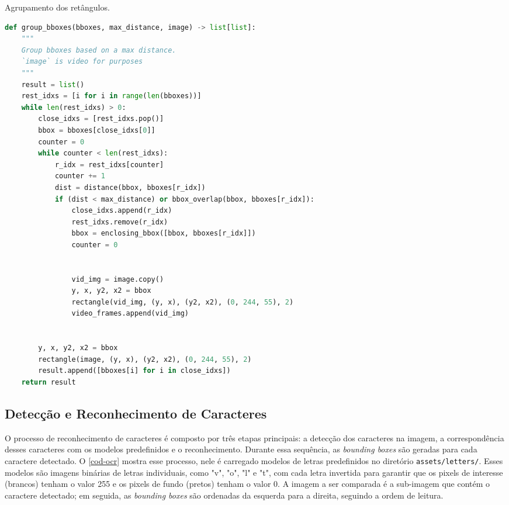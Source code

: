 \documentclass[english, 
               brazil, 
               bsc] %
               {dcomp-abntex2}
\begin{document}
\begin{codigo}[h]
  \caption{\small Agrupamento dos retângulos.}
 \label{cod-group_bboxes}
\begin{lstlisting}[language=python]
def group_bboxes(bboxes, max_distance, image) -> list[list]:
    """
    Group bboxes based on a max distance.
    `image` is video for purposes
    """
    result = list()
    rest_idxs = [i for i in range(len(bboxes))]
    while len(rest_idxs) > 0:
        close_idxs = [rest_idxs.pop()]
        bbox = bboxes[close_idxs[0]]
        counter = 0
        while counter < len(rest_idxs):
            r_idx = rest_idxs[counter]
            counter += 1
            dist = distance(bbox, bboxes[r_idx])
            if (dist < max_distance) or bbox_overlap(bbox, bboxes[r_idx]):
                close_idxs.append(r_idx)
                rest_idxs.remove(r_idx)
                bbox = enclosing_bbox([bbox, bboxes[r_idx]])
                counter = 0


                vid_img = image.copy()
                y, x, y2, x2 = bbox
                rectangle(vid_img, (y, x), (y2, x2), (0, 244, 55), 2)
                video_frames.append(vid_img)


        y, x, y2, x2 = bbox
        rectangle(image, (y, x), (y2, x2), (0, 244, 55), 2)
        result.append([bboxes[i] for i in close_idxs])
    return result
\end{lstlisting}
\end{codigo}


\subsection{Detecção e Reconhecimento de Caracteres} \label{sec-ocr}




O processo de reconhecimento de caracteres é composto por três etapas principais: a detecção dos caracteres na imagem, a correspondência desses caracteres com os modelos predefinidos e o reconhecimento. Durante essa sequência, as \textit{bounding boxes} são geradas para cada caractere detectado. O \autoref{cod-ocr} mostra esse processo, nele é carregado modelos de letras predefinidos no diretório \texttt{assets/letters/}. Esses modelos são imagens binárias de letras individuais, como "v", "o", "l" e "t", com cada letra invertida para garantir que os pixels de interesse (brancos) tenham o valor 255 e os pixels de fundo (pretos) tenham o valor 0. A imagem a ser comparada é a sub-imagem que contém o caractere detectado; em seguida, as \textit{bounding boxes} são ordenadas da esquerda para a direita, seguindo a ordem de leitura.
\end{document}
